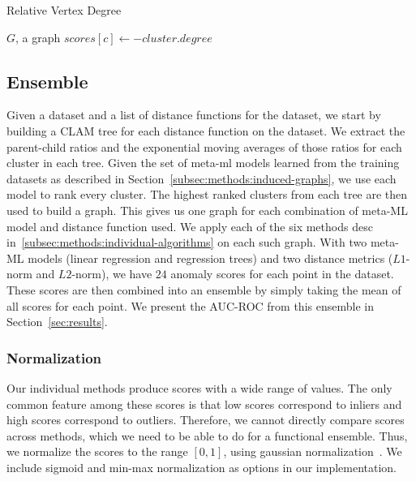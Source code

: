 \begin{algorithm}[h]
    \caption{Relative Vertex Degree}
    \label{alg:rvd}
\begin{algorithmic}[1]
    \REQUIRE $G$, a graph
    \STATE $scores[c] \gets -cluster.degree$
    \ENDFOR
\end{algorithmic}
\end{algorithm}


\subsection{Ensemble}
\label{subsec:methods:ensemble}

Given a dataset and a list of distance functions for the dataset, we start by building a CLAM tree for each distance function on the dataset.
We extract the parent-child ratios and the exponential moving averages of those ratios for each cluster in each tree.
Given the set of meta-ml models learned from the training datasets as described in Section~\ref{subsec:methods:induced-graphs}, we use each model to rank every cluster.
The highest ranked clusters from each tree are then used to build a graph.
This gives us one graph for each combination of meta-ML model and distance function used.
We apply each of the six methods desc in~\ref{subsec:methods:individual-algorithms} on each such graph.
With two meta-ML models (linear regression and regression trees) and two distance metrics ($L1$-norm and $L2$-norm), we have $24$ anomaly scores for each point in the dataset.
These scores are then combined into an ensemble by simply taking the mean of all scores for each point.
We present the AUC-ROC from this ensemble in Section~\ref{sec:results}.

\subsubsection{Normalization}
\label{subsubsec:methods:normalization}

Our individual methods produce scores with a wide range of values.
The only common feature among these scores is that low scores correspond to inliers and high scores correspond to outliers.
Therefore, we cannot directly compare scores across methods, which we need to be able to do for a functional ensemble.
Thus, we normalize the scores to the range $[0, 1]$, using gaussian normalization~\cite{kriegel2011interpreting}.
We include sigmoid and min-max normalization as options in our implementation.


